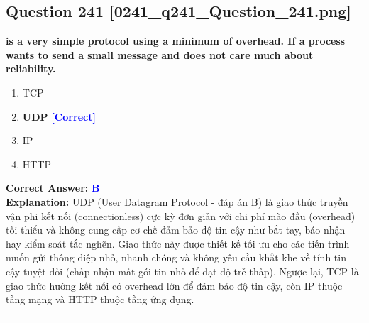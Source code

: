 \documentclass[11pt,a4paper]{article}
\begin{document}
\begin{minipage}{\textwidth}
\subsection*{Question 241 \quad \footnotesize{[0241\_q241\_Question\_241.png]}}
\noindent \textbf{is a very simple protocol using a minimum of overhead. If a process wants to send a small message and does not care much about reliability.}

\begin{enumerate}[label=\Alph*.]
    \item TCP
    \item \textbf{UDP} \hfill \textcolor{blue}{\textbf{[Correct]}}
    \item IP
    \item HTTP
\end{enumerate}

\noindent \textbf{Correct Answer:} \textcolor{blue}{\textbf{B}} \\[2pt]
\noindent \textbf{Explanation:} UDP (User Datagram Protocol - đáp án B) là giao thức truyền vận phi kết nối (connectionless) cực kỳ đơn giản với chi phí mào đầu (overhead) tối thiểu và không cung cấp cơ chế đảm bảo độ tin cậy như bắt tay, báo nhận hay kiểm soát tắc nghẽn. Giao thức này được thiết kế tối ưu cho các tiến trình muốn gửi thông điệp nhỏ, nhanh chóng và không yêu cầu khắt khe về tính tin cậy tuyệt đối (chấp nhận mất gói tin nhỏ để đạt độ trễ thấp). Ngược lại, TCP là giao thức hướng kết nối có overhead lớn để đảm bảo độ tin cậy, còn IP thuộc tầng mạng và HTTP thuộc tầng ứng dụng.

\par\vspace{0.3cm}
\hrule
\vspace{0.3cm}
\end{minipage}
\end{document}
